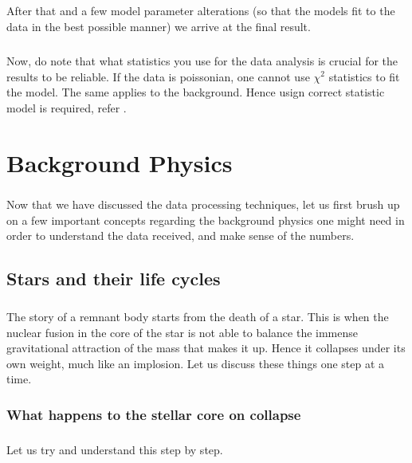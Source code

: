 \documentclass[a4paper,twoside]{report}
\numberwithin{equation}{section}
\begin{document}
\paragraph{}
After that and a few model parameter alterations (so that the models fit to the data in the best possible manner) we arrive at the final result. 
\paragraph{}
Now, do note that what statistics you use for the data analysis is crucial for the results to be reliable. If the data is poissonian, one cannot use $\chi^2$ statistics to fit the model. The same applies to the background. Hence usign correct statistic model is required, refer \cite{redchisquared}.








\newpage
\chapter{Background Physics}
\paragraph{}
Now that we have discussed the data processing techniques, let us first brush up on a few important concepts regarding the background physics one might need in order to understand the data received, and make sense of the numbers.
\section{Stars and their life cycles}
\paragraph{}
The story of a remnant body starts from the death of a star. This is when the nuclear fusion in the core of the star is not able to balance the immense gravitational attraction of the mass that makes it up. Hence it collapses under its own weight, much like an implosion. Let us discuss these things one step at a time. 
\subsection{What happens to the stellar core on collapse}
\paragraph{}
Let us try and understand this step by step. 
\end{document}
